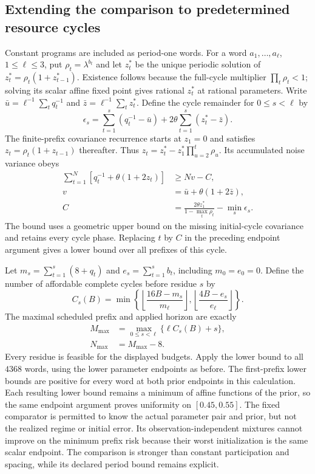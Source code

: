 \subsection{Extending the comparison to predetermined resource cycles}
Constant programs are included as period-one words.
For a word $a_1,\ldots,a_\ell$, $1\le\ell\le3$, put $\rho_t=\lambda^{b_t}$ and let $z_t^*$ be the unique periodic solution of $z_t^*=\rho_t(1+z_{t-1}^*)$.
Existence follows because the full-cycle multiplier $\prod_t\rho_t<1$; solving its scalar affine fixed point gives rational $z_t^*$ at rational parameters.
Write $\bar u=\ell^{-1}\sum_tq_t^{-1}$ and $\bar z=\ell^{-1}\sum_tz_t^*$.
Define the cycle remainder for $0\le s<\ell$ by
\[
\epsilon_s=\sum_{t=1}^s(q_t^{-1}-\bar u)+2\theta\sum_{t=1}^s(z_t^*-\bar z).
\]
The finite-prefix covariance recurrence starts at $z_1=0$ and satisfies $z_t=\rho_t(1+z_{t-1})$ thereafter.
Thus $z_t=z_t^*-z_1^*\prod_{u=2}^t\rho_u$.
Its accumulated noise variance obeys
\begin{align*}
\sum_{t=1}^N[q_t^{-1}+\theta(1+2z_t)]&\ge Nv-C,\\
v&=\bar u+\theta(1+2\bar z),\\
C&=\frac{2\theta z_1^*}{1-\max_t\rho_t}-\min_s\epsilon_s.
\end{align*}
The bound uses a geometric upper bound on the missing initial-cycle covariance and retains every cycle phase.
Replacing $t$ by $C$ in the preceding endpoint argument gives a lower bound over all prefixes of this cycle.

Let $m_s=\sum_{t=1}^s(8+q_t)$ and $e_s=\sum_{t=1}^sb_t$, including $m_0=e_0=0$.
Define the number of affordable complete cycles before residue $s$ by
\[
C_s(B)=\min\left\{\left\lfloor\frac{16B-m_s}{m_\ell}\right\rfloor,
\left\lfloor\frac{4B-e_s}{e_\ell}\right\rfloor\right\}.
\]
The maximal scheduled prefix and applied horizon are exactly
\begin{align*}
M_{\max}&=\max_{0\le s<\ell}\{\ell C_s(B)+s\},\\
N_{\max}&=M_{\max}-8.
\end{align*}
Every residue is feasible for the displayed budgets.
Apply the lower bound to all $4368$ words, using the lower parameter endpoints as before.
The first-prefix lower bounds are positive for every word at both prior endpoints in this calculation.
Each resulting lower bound remains a minimum of affine functions of the prior, so the same endpoint argument proves uniformity on $[0.45,0.55]$.
The fixed comparator is permitted to know the actual parameter pair and prior, but not the realized regime or initial error.
Its observation-independent mixtures cannot improve on the minimum prefix risk because their worst initialization is the same scalar endpoint.
The comparison is stronger than constant participation and spacing, while its declared period bound remains explicit.

